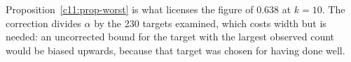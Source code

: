 Proposition~\ref{c11:prop-worst} is what licenses the figure of 0.638 at $k = 10$.
The correction divides $\alpha$ by the 230 targets examined, which costs width but is
needed: an uncorrected bound for the target with the largest observed count would be
biased upwards, because that target was chosen for having done well.
